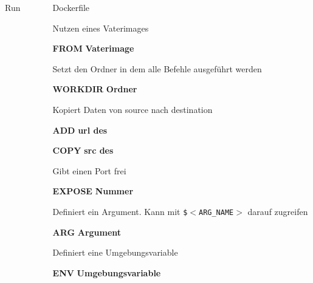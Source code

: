 \documentclass[final]{beamer}
\newlength{\sepwid}
\newlength{\onecolwid}
\newlength{\specialcolwid}
\begin{document}
\begin{frame}
\begin{columns}[t]
\begin{column}{\specialcolwid}
\begin{block}{Run}
\end{block}



\end{column} %

\begin{column}{\sepwid}\end{column} %

\begin{column}{\onecolwid} %





\begin{block}{Dockerfile}

\par Nutzen eines Vaterimages
\par \textcolor{docker-pu}{\textbf{FROM}} \textcolor{docker-red}{\textbf{Vaterimage}}

\vspace{1cm}
\par Setzt den Ordner in dem alle Befehle ausgeführt werden
\par \textcolor{docker-pu}{\textbf{WORKDIR}} \textcolor{docker-red}{\textbf{Ordner}}

\vspace{1cm}
\par Kopiert Daten von source nach destination
\par \textcolor{docker-pu}{\textbf{ADD}} \textcolor{docker-red}{\textbf{url des}}
\par \textcolor{docker-pu}{\textbf{COPY}} \textcolor{docker-red}{\textbf{src des}}

\vspace{1cm}
\par Gibt einen Port frei
\par \textcolor{docker-pu}{\textbf{EXPOSE}} \textcolor{docker-red}{\textbf{Nummer}}

\vspace{1cm}
\par Definiert ein Argument. Kann mit \texttt{\$$<$ARG\_NAME$>$} darauf zugreifen \par \textcolor{docker-pu}{\textbf{ARG}} \textcolor{docker-red}{\textbf{Argument}}

\vspace{1cm}
\par Definiert eine Umgebungsvariable
\par \textcolor{docker-pu}{\textbf{ENV}} \textcolor{docker-red}{\textbf{Umgebungsvariable}}


\end{block}
\end{column}
\end{columns}
\end{frame}
\end{document}
